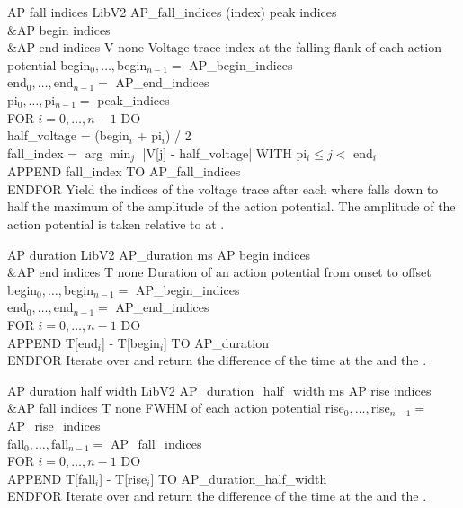 \begin{efeature}
  {AP fall indices}
  {LibV2}
  {AP\_fall\_indices}
  {(index)}
  {peak indices\\&AP begin indices\\&AP end indices}
  {V}
  {none}
  {Voltage trace index at the falling flank of each action potential}
  {
  begin$_0, \ldots, $begin$_{n-1} =$ AP\_begin\_indices \\
  end$_0, \ldots, $end$_{n-1} =$ AP\_end\_indices \\
  pi$_0, \ldots, $pi$_{n-1} =$ peak\_indices \\
  FOR $i = 0, \dots, n - 1$ DO \+ \\
    half\_voltage = (begin$_i$ + pi$_i$) / 2 \\
    fall\_index = $\arg\min_j$ |V[j] - half\_voltage| WITH pi$_i \le j <$ end$_i$ \\
    APPEND fall\_index TO AP\_fall\_indices \- \\
  ENDFOR
  }
  Yield the indices of the voltage trace after each  where  falls down to half the maximum of the amplitude of the action potential.
  The amplitude of the action potential is taken relative to  at .
  
\end{efeature}

\begin{efeature}
  {AP duration}
  {LibV2}
  {AP\_duration}
  {ms}
  {AP begin indices\\&AP end indices}
  {T}
  {none}
  {Duration of an action potential from onset to offset}
  {
  begin$_0, \ldots, $begin$_{n-1} =$ AP\_begin\_indices \\
  end$_0, \ldots, $end$_{n-1} =$ AP\_end\_indices \\
  FOR $i = 0, \dots, n - 1$ DO \+ \\
    APPEND T[end$_i$] - T[begin$_i$] TO AP\_duration \- \\
  ENDFOR
  }
  Iterate over  and return the difference of the time at the  and the .
  
\end{efeature}

\begin{efeature}
  {AP duration half width}
  {LibV2}
  {AP\_duration\_half\_width}
  {ms}
  {AP rise indices\\&AP fall indices}
  {T}
  {none}
  {FWHM of each action potential}
  {
  rise$_0, \ldots, $rise$_{n-1} =$ AP\_rise\_indices \\
  fall$_0, \ldots, $fall$_{n-1} =$ AP\_fall\_indices \\
  FOR $i = 0, \dots, n - 1$ DO \+ \\
    APPEND T[fall$_i$] - T[rise$_i$] TO AP\_duration\_half\_width \- \\
  ENDFOR
  }
  Iterate over  and return the difference of the time at the  and the .
  
\end{efeature}

